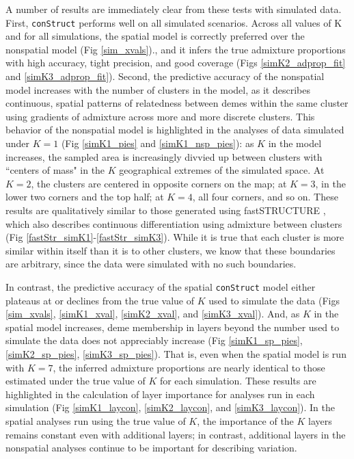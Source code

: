 \documentclass[12pt]{article}
\begin{document}
A number of results are immediately clear from these tests with simulated data.
First, \texttt{conStruct} performs well on all simulated scenarios.
Across all values of K and for all simulations, 
the spatial model is correctly preferred over the nonspatial model (Fig \ref{sim_xvals})., 
and it infers the true admixture proportions with high accuracy, tight precision, and good coverage 
(Figs \ref{simK2_adprop_fit} and \ref{simK3_adprop_fit}).
Second, the predictive accuracy of the nonspatial model increases 
with the number of clusters in the model, 
as it describes continuous, spatial patterns of relatedness between demes within the same cluster 
using gradients of admixture across more and more discrete clusters.
This behavior of the nonspatial model is highlighted in 
the analyses of data simulated under $K=1$ (Fig \ref{simK1_pies} and \ref{simK1_nsp_pies}):
as $K$ in the model increases, 
the sampled area is increasingly divvied up between clusters 
with ``centers of mass" in the $K$ geographical extremes of the simulated space.
At $K=2$, the clusters are centered in opposite corners on the map; 
at $K=3$, in the lower two corners and the top half; 
at $K=4$, all four corners, and so on.
These results are qualitatively similar to those generated using fastSTRUCTURE \citep{fastStructure}, 
which also describes continuous differentiation using admixture between clusters
 (Fig \ref{fastStr_simK1}-\ref{fastStr_simK3}).
While it is true that each cluster is more similar within itself
than it is to other clusters,
we know that these boundaries are arbitrary,
since the data were simulated with no such boundaries.

In contrast, the predictive accuracy of the spatial \texttt{conStruct} model
either plateaus at or declines from the true value of $K$ used to simulate the data 
(Figs \ref{sim_xvals}, \ref{simK1_xval}, \ref{simK2_xval}, and \ref{simK3_xval}).
And, as $K$ in the spatial model increases, 
deme membership in layers beyond the number used to simulate the data does not appreciably increase 
(Fig \ref{simK1_sp_pies}, \ref{simK2_sp_pies}, \ref{simK3_sp_pies}).
That is, even when the spatial model is run with $K=7$, 
the inferred admixture proportions are nearly identical to 
those estimated under the true value of $K$ for each simulation.
These results are highlighted in the calculation of layer importance for 
analyses run in each simulation (Fig \ref{simK1_laycon}, \ref{simK2_laycon}, and \ref{simK3_laycon}).
In the spatial analyses run using the true value of $K$,
the importance of the $K$ layers remains constant even with additional layers;
in contrast, additional layers in the nonspatial analyses continue to be important for describing variation.
\end{document}
